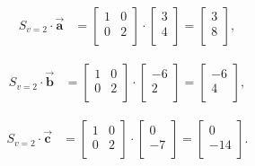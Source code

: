 \vspace{-.15in}
\begin{align*}
S_{v=2} \cdot \overrightarrow{\textbf{a}} &=
\begin{bmatrix}
1 & 0 \\
0 & 2 \\
\end{bmatrix} \cdot
\begin{bmatrix}
3 \\ 4 \\
\end{bmatrix} =
\begin{bmatrix}
3 \\ 8 \\
\end{bmatrix},
\end{align*}

\vspace{-.15in}
\begin{align*}
S_{v=2} \cdot \overrightarrow{\textbf{b}} &=
\begin{bmatrix}
1 & 0 \\
0 & 2 \\
\end{bmatrix} \cdot
\begin{bmatrix}
-6 \\ 2 \\
\end{bmatrix} =
\begin{bmatrix}
-6 \\ 4 \\
\end{bmatrix},
\end{align*}

\vspace{-.15in}
\begin{align*}
S_{v=2} \cdot \overrightarrow{\textbf{c}} &=
\begin{bmatrix}
1 & 0 \\
0 & 2 \\
\end{bmatrix} \cdot
\begin{bmatrix}
0 \\ -7 \\
\end{bmatrix} =
\begin{bmatrix}
0 \\ -14 \\
\end{bmatrix}.
\end{align*}
\vspace{-.15in}

